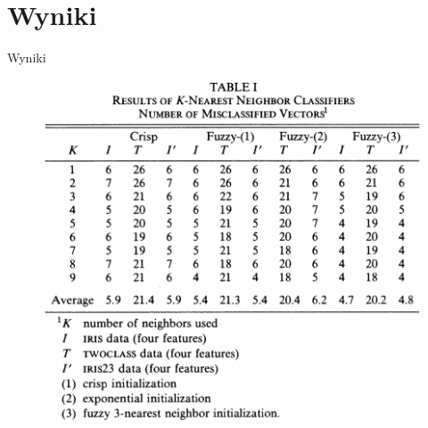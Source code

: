 \documentclass{beamer}
\begin{document}
\section{Wyniki}
\begin{frame}{Wyniki}
\begin{figure}[H]
\begin{center}
\includegraphics[scale=0.37]{wyniki_1.png}
\end{center}
\end{figure}
   
\end{frame}
\end{document}
